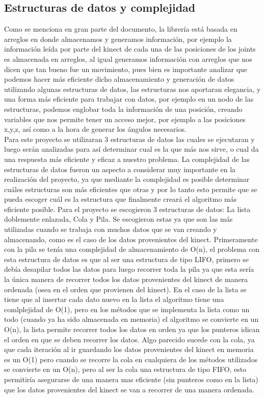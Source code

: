 \documentclass[letterpaper]{article}
\begin{document}
\subsection{Estructuras de datos y complejidad}
\quad \quad Como se menciona en gran parte del documento, la librería está basada en arreglos en donde almacenamos y generamos información, por ejemplo la información leída por parte del kinect de cada una de las posiciones de los joints es almacenada en arreglos, al igual generamos información con arreglos que nos dicen que tan bueno fue un movimiento, pues bien es importante analizar que podemos hacer más eficiente dicho almacenamiento y generación de datos utilizando algunas estructuras de datos, las estructuras nos aportaran elegancia, y una forma más eficiente para trabajar con datos, por ejemplo en un nodo de las estructuras, podemos englobar toda la información de una posición, creando variables que nos permite tener un acceso mejor, por ejemplo a las posiciones x,y,z, así como a la hora de generar los ángulos necesarios.
\\ Para este proyecto se utilizaran 3 estructuras de datos las cuales se ejecutaran y luego serán analizadas para así determinar cual es la que más nos sirve, o cual da una respuesta más eficiente y eficaz a nuestro problema.
 La complejidad de las estructuras de datos fueron un aspecto a considerar muy importante en la realización del proyecto, ya que mediante la complejidad es posible determinar cuáles estructuras son más eficientes que otras y por lo tanto esto permite que se pueda escoger cuál es la estructura que finalmente creará el algoritmo más eficiente posible. Para el proyecto se escogieron 3 estructuras de datos: La lista doblemente enlazada, Cola y Pila. Se escogieron estas ya que son las más utilizadas cuando se trabaja con muchos datos que se van creando y almacenando, como es el caso de los datos provenientes del kinect. Primeramente con la pila se tenía una complejidad de almacenamiento de O(n), el problema con esta estructura de datos es que al ser una estructura de tipo LIFO, primero se debía desapilar todos las datos para luego recorrer toda la pila ya que esta sería la única manera de recorrer todos los datos provenientes del kinect de manera ordenada (osea en el orden que provienen del kinect). En el caso de la lista se tiene que al insertar cada dato nuevo en la lista el algoritmo tiene una comlplejidad de O(1), pero en los métodos que se implementa la lista como un todo (cuando ya ha sido almacenada en memoria) el algoritmo se convierte en un O(n), la lista permite recorrer todos los datos en orden ya que los punteros idican el orden en que se deben recorrer los datos. Algo parecido sucede con la cola, ya que cada iteración al ir guardando los datos provenientes del kinect en memoria es un O(1) pero cuando se recorre la cola en cualquiera de los métodos utilizados se convierte en un O(n), pero al ser la cola una estructura de tipo FIFO, esto permitiría asegurarse de una manera mas eficiente (sin punteros como en la lista) que los datos provenientes del kinect se van a recorrer de una manera ordenada.
\end{document}
